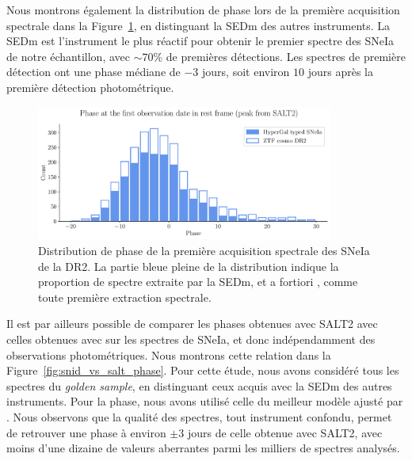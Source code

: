 \documentclass[../main/main.tex]{subfiles}
\begin{document}
Nous montrons également la distribution de phase lors de la première
acquisition spectrale dans la Figure~\ref{fig:phaseIa}, en distinguant la
SEDm des autres instruments. La SEDm est l'instrument
le plus réactif pour obtenir le premier spectre des SNeIa de notre
échantillon, avec $\sim70\%$ de premières détections. Les spectres
de première détection ont une phase médiane de $-3$ jours, soit environ
$10$ jours après la première détection photométrique.

\begin{figure}[ht]
  \centering
  \includegraphics[width=0.87\textwidth]{../figures/09_dr2/phaseIadr2.pdf}
  \caption[Distribution de phase de la première acquisition spectrale
  des SNeIa de la DR2.]{Distribution de phase de la première acquisition spectrale
  des SNeIa de la DR2. La partie bleue pleine de la distribution indique
la proportion de spectre extraite par la SEDm, et a fortiori \hypergal,
comme toute première extraction spectrale.}
  \label{fig:phaseIa}
\end{figure}


Il est par ailleurs possible de comparer les phases obtenues avec SALT2
avec celles obtenues avec  sur les spectres de SNeIa, et donc
indépendamment des observations photométriques. Nous montrons cette
relation dans la Figure~\ref{fig:snid_vs_salt_phase}. Pour cette étude,
nous avons considéré tous les spectres du \textit{golden sample}, en
distinguant ceux acquis avec la SEDm des autres instruments. Pour la
phase, nous avons utilisé celle du meilleur modèle ajusté par
. Nous observons que la qualité des spectres, tout instrument
confondu, permet de retrouver une phase à environ $\pm3$ jours de celle
obtenue avec SALT2, avec moins d'une dizaine de valeurs aberrantes
parmi les milliers de spectres analysés.
\end{document}
